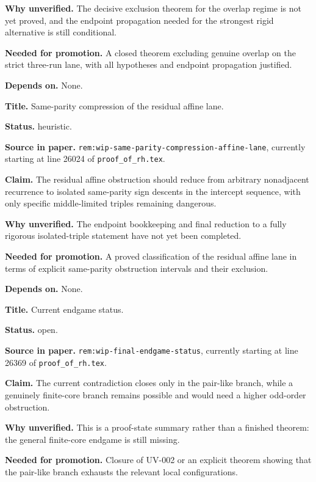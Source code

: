 \documentclass[11pt,a4paper]{amsart}
\begin{document}
\begin{description}[style=nextline,leftmargin=2.9cm,font=\normalfont\bfseries]
\textbf{Why unverified.} The decisive exclusion theorem for the overlap regime
is not yet proved, and the endpoint propagation needed for the strongest rigid
alternative is still conditional.

\textbf{Needed for promotion.} A closed theorem excluding genuine overlap on the
strict three-run lane, with all hypotheses and endpoint propagation justified.

\textbf{Depends on.} None.

\item[UV-006]
\textbf{Title.} Same-parity compression of the residual affine lane.

\textbf{Status.} heuristic.

\textbf{Source in paper.}
\texttt{rem:wip-same-parity-compression-affine-lane}, currently starting at
line 26024 of \texttt{proof\_of\_rh.tex}.

\textbf{Claim.} The residual affine obstruction should reduce from arbitrary
nonadjacent recurrence to isolated same-parity sign descents in the intercept
sequence, with only specific middle-limited triples remaining dangerous.

\textbf{Why unverified.} The endpoint bookkeeping and final reduction to a fully
rigorous isolated-triple statement have not yet been completed.

\textbf{Needed for promotion.} A proved classification of the residual affine
lane in terms of explicit same-parity obstruction intervals and their exclusion.

\textbf{Depends on.} None.

\item[UV-007]
\textbf{Title.} Current endgame status.

\textbf{Status.} open.

\textbf{Source in paper.} \texttt{rem:wip-final-endgame-status}, currently
starting at line 26369 of \texttt{proof\_of\_rh.tex}.

\textbf{Claim.} The current contradiction closes only in the pair-like branch,
while a genuinely finite-core branch remains possible and would need a higher
odd-order obstruction.

\textbf{Why unverified.} This is a proof-state summary rather than a finished
theorem: the general finite-core endgame is still missing.

\textbf{Needed for promotion.} Closure of UV-002 or an explicit theorem showing
that the pair-like branch exhausts the relevant local configurations.


\end{description}
\end{document}

